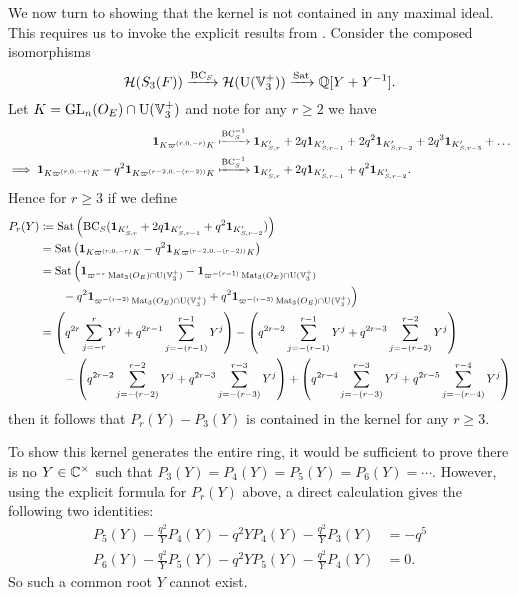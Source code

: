We now turn to showing that the kernel is not contained in any maximal ideal.
This requires us to invoke the explicit results from .
Consider the composed isomorphisms
\[ \mathcal H(S_3(F)) \xrightarrow{\operatorname{BC}_S} \mathcal H(\operatorname{U}(\mathbb V_3^+)) \xrightarrow{\operatorname{Sat}} \mathbb Q[Y + Y^{-1}]. \]
Let $K =  \operatorname{GL}_n(O_E) \cap \operatorname{U}(\mathbb V_3^+)$ and note for any $r \ge 2$ we have
\begin{align*}
  \mathbf{1}_{K\varpi^{(r,0,-r)}K}
  &\xmapsto{\operatorname{BC}_S^{-1}}
  \mathbf{1}_{K'_{S, r}} + 2q \mathbf{1}_{K'_{S, r-1}} + 2q^2 \mathbf{1}_{K'_{S, r-2}} + 2q^3 \mathbf{1}_{K'_{S, r-3}} + \dots \\
  \implies
  \mathbf{1}_{K\varpi^{(r,0,-r)}K} - q^2 \mathbf{1}_{K\varpi^{(r-2,0,-(r-2))}K}
  &\xmapsto{\operatorname{BC}_S^{-1}}
  \mathbf{1}_{K'_{S, r}} + 2q \mathbf{1}_{K'_{S, r-1}} + q^2 \mathbf{1}_{K'_{S, r-2}}.
\end{align*}
Hence for $r \ge 3$ if we define
\begin{align*}
  P_r(Y) &\coloneqq \operatorname{Sat}\left(\operatorname{BC}_S(\mathbf{1}_{K'_{S, r}}
    + 2q \mathbf{1}_{K'_{S, r-1}} + q^2 \mathbf{1}_{K'_{S, r-2}})\right) \\
  &= \operatorname{Sat}\left( \mathbf{1}_{K\varpi^{(r,0,-r)}K} - q^2 \mathbf{1}_{K\varpi^{(r-2,0,-(r-2))}K} \right) \\
  &= \operatorname{Sat}\Big(
    \mathbf{1}_{\varpi^{-r} \operatorname{Mat}_3(O_E) \cap \operatorname{U}(\mathbb V_3^+)}
    - \mathbf{1}_{\varpi^{-(r-1)} \operatorname{Mat}_3(O_E) \cap \operatorname{U}(\mathbb V_3^+)} \\
    &\qquad- q^2 \mathbf{1}_{\varpi^{-(r-2)} \operatorname{Mat}_3(O_E) \cap \operatorname{U}(\mathbb V_3^+)}
    + q^2 \mathbf{1}_{\varpi^{-(r-3)} \operatorname{Mat}_3(O_E) \cap \operatorname{U}(\mathbb V_3^+)}
    \Big) \\
  &= \left( q^{2r} \sum_{j=-r}^r Y^j + q^{2r-1} \sum_{j=-(r-1)}^{r-1} Y^j \right)
  - \left( q^{2r-2} \sum_{j=-(r-1)}^{r-1} Y^j + q^{2r-3} \sum_{j=-(r-2)}^{r-2} Y^j \right) \\
  &\qquad- \left( q^{2r-2} \sum_{j=-(r-2)}^{r-2} Y^j + q^{2r-3} \sum_{j=-(r-3)}^{r-3} Y^j \right)
  + \left( q^{2r-4} \sum_{j=-(r-3)}^{r-3} Y^j + q^{2r-5} \sum_{j=-(r-4)}^{r-4} Y^j \right)
\end{align*}
then it follows that $P_r(Y) - P_3(Y)$ is contained in the kernel for any $r \ge 3$.

To show this kernel generates the entire ring, it would be sufficient to prove
there is no $Y \in \mathbb C^\times$ such that $P_3(Y) = P_4(Y) = P_5(Y) = P_6(Y) = \dotsb$.
However, using the explicit formula for $P_r(Y)$ above,
a direct calculation gives the following two identities:
\begin{align*}
  P_5(Y) - \frac{q^2}{Y} P_4(Y) - q^2 Y P_4(Y) - \frac{q^2}{Y} P_3(Y) &= -q^5 \\
  P_6(Y) - \frac{q^2}{Y} P_5(Y) - q^2 Y P_5(Y) - \frac{q^2}{Y} P_4(Y) &= 0.
\end{align*}
So such a common root $Y$ cannot exist.

